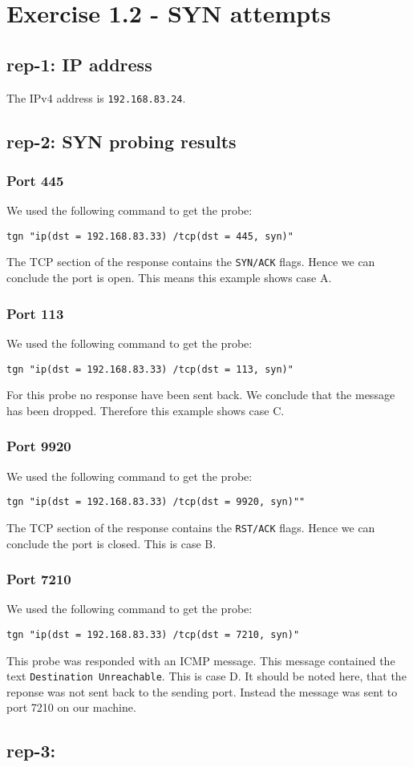 \section*{Exercise 1.2 - SYN attempts}
\subsection*{rep-1: IP address}
The IPv4 address is \texttt{192.168.83.24}.


\subsection*{rep-2: SYN probing results}

\subsubsection*{Port 445}
We used the following command to get the probe:
\begin{verbatim}
tgn "ip(dst = 192.168.83.33) /tcp(dst = 445, syn)"
\end{verbatim}
The TCP section of the response contains the \texttt{SYN/ACK} flags. Hence we can conclude the port is open. This means this example shows case A.

\subsubsection*{Port 113}
We used the following command to get the probe:
\begin{verbatim}
tgn "ip(dst = 192.168.83.33) /tcp(dst = 113, syn)"
\end{verbatim}
For this probe no response have been sent back. We conclude that the message has been dropped. Therefore this example shows case C.


\subsubsection*{Port 9920}
We used the following command to get the probe:
\begin{verbatim}
tgn "ip(dst = 192.168.83.33) /tcp(dst = 9920, syn)""
\end{verbatim}
The TCP section of the response contains the \texttt{RST/ACK} flags. Hence we can conclude the port is closed. This is case B.


\subsubsection*{Port 7210}
We used the following command to get the probe:
\begin{verbatim}
tgn "ip(dst = 192.168.83.33) /tcp(dst = 7210, syn)"
\end{verbatim}
This probe was responded with an ICMP message. This message contained the text \texttt{Destination Unreachable}. This is case D. It should be noted here, that the reponse was not sent back to the sending port. Instead the message was sent to port 7210 on our machine.



\subsection*{rep-3:}